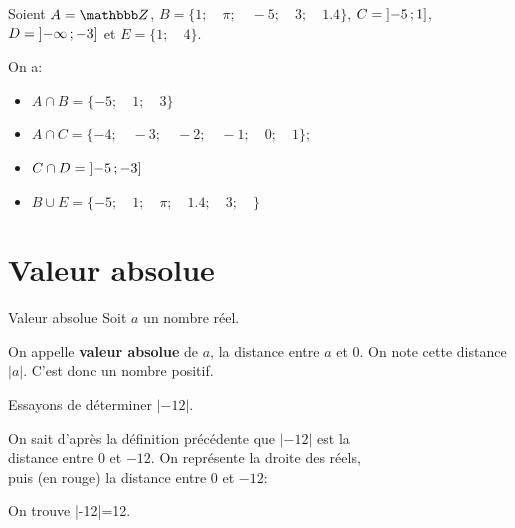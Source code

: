 \documentclass[10pt,a4paper,openany,twoside,prof]{book}
\begin{document}
\begin{ex}{}{}
  Soient $A = \Z$, $B=\{1;\quad \pi;\quad -5;\quad 3;\quad1.4\}$, $C=\mathopen{]}-5\mathclose{}\mathpunct{};1\mathclose{]}$, $D=\mathopen{]}-\infty\mathclose{}\mathpunct{};-3\mathclose{]}$ et $E=\{1; \quad4\}$.

	On a:
	\begin{itemize}
		\item
		$A\cap B=\{-5;\quad 1;\quad 3\}$
		\item $A\cap C=\{-4;\quad -3;\quad -2;\quad-1;\quad0;\quad1\};$
		\item $C\cap D = \mathopen{]}-5\mathclose{}\mathpunct{};-3\mathclose{]}$
		\item $B\cup E = \{-5;\quad 1;\quad \pi;\quad 1.4;\quad 3;\quad \}$
	\end{itemize}
\end{ex}

\section{Valeur absolue}

\begin{defi}{Valeur absolue}{}
Soit $a$ un nombre réel.

 On appelle \textbf{valeur absolue} de $a$, la distance entre $a$ et $0$. On note cette distance $|a|$. C'est donc un nombre positif.
\end{defi}

\smallskip
\begin{ex}{}{}
Essayons de déterminer $|-12|$.\medskip

 On sait d'après la définition précédente que $|-12|$ est la \\distance entre $0$ et $-12$. On représente la droite des réels, \\puis (en rouge) la distance entre $0$ et $-12$:

\vspace{-15mm}
\begin{flushright}
\end{flushright}

 On trouve |-12|=12.
\end{ex}
\end{document}
